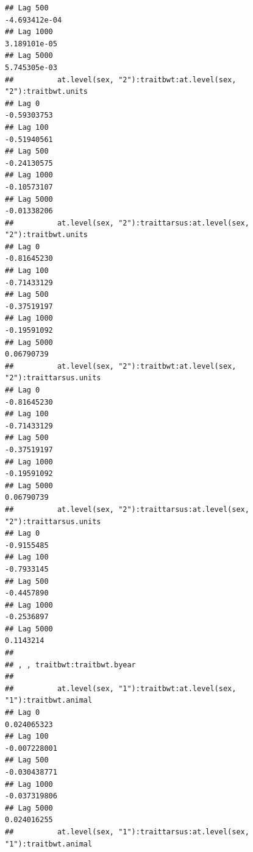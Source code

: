 \documentclass[
  12pt,
]{book}
\begin{document}
\begin{verbatim}
## Lag 500                                                        -4.693412e-04
## Lag 1000                                                        3.189101e-05
## Lag 5000                                                        5.745305e-03
##          at.level(sex, "2"):traitbwt:at.level(sex, "2"):traitbwt.units
## Lag 0                                                      -0.59303753
## Lag 100                                                    -0.51940561
## Lag 500                                                    -0.24130575
## Lag 1000                                                   -0.10573107
## Lag 5000                                                   -0.01338206
##          at.level(sex, "2"):traittarsus:at.level(sex, "2"):traitbwt.units
## Lag 0                                                         -0.81645230
## Lag 100                                                       -0.71433129
## Lag 500                                                       -0.37519197
## Lag 1000                                                      -0.19591092
## Lag 5000                                                       0.06790739
##          at.level(sex, "2"):traitbwt:at.level(sex, "2"):traittarsus.units
## Lag 0                                                         -0.81645230
## Lag 100                                                       -0.71433129
## Lag 500                                                       -0.37519197
## Lag 1000                                                      -0.19591092
## Lag 5000                                                       0.06790739
##          at.level(sex, "2"):traittarsus:at.level(sex, "2"):traittarsus.units
## Lag 0                                                             -0.9155485
## Lag 100                                                           -0.7933145
## Lag 500                                                           -0.4457890
## Lag 1000                                                          -0.2536897
## Lag 5000                                                           0.1143214
## 
## , , traitbwt:traitbwt.byear
## 
##          at.level(sex, "1"):traitbwt:at.level(sex, "1"):traitbwt.animal
## Lag 0                                                       0.024065323
## Lag 100                                                    -0.007228001
## Lag 500                                                    -0.030438771
## Lag 1000                                                   -0.037319806
## Lag 5000                                                    0.024016255
##          at.level(sex, "1"):traittarsus:at.level(sex, "1"):traitbwt.animal

\end{verbatim}
\end{document}

